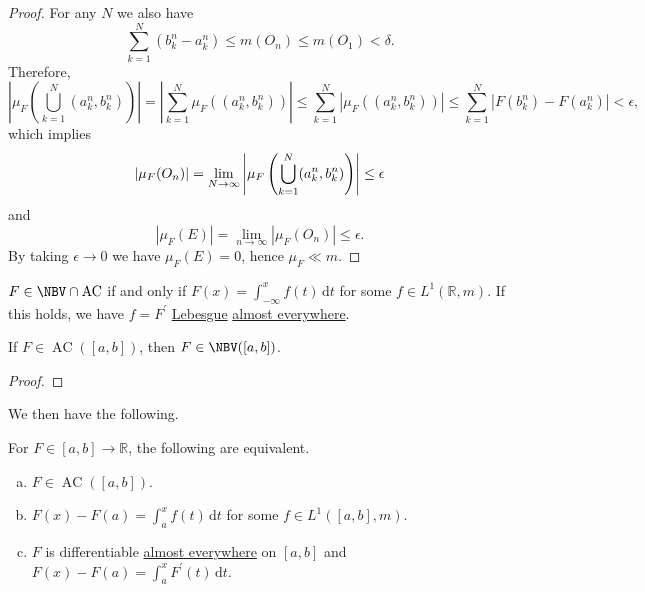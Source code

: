 \begin{proof}
	For any \(N\) we also have
	\[
		\sum_{k=1}^N (b_k^n - a_k^n) \leq m(O_n) \leq m(O_1) < \delta.
	\]
	Therefore,
	\[
		\left\vert \mu_F\left( \bigcup_{k=1}^N (a_k^n,b_k^n) \right) \right\vert
		= \left\vert \sum_{k=1}^N \mu_F((a_k^n,b_k^n)) \right\vert
		\leq \sum_{k=1}^N \left\vert \mu_F((a_k^n,b_k^n)) \right\vert
		\leq \sum_{k=1}^N \left\vert F(b_k^n) - F(a_k^n) \right\vert < \epsilon,
	\]
	which implies
	\[
		\left\vert \mu_F(O_n) \right\vert = \lim_{N \to \infty} \left\vert \mu_F\left( \bigcup_{k=1}^N (a_k^n,b_k^n) \right) \right\vert \leq \epsilon \\
	\]
	and
	\[
		\left\vert \mu_F(E) \right\vert = \lim_{n \to \infty} \left\vert \mu_F(O_n) \right\vert \leq \epsilon.
	\]
	By taking \(\epsilon \to 0\) we have \(\mu_F(E) = 0\), hence \(\mu_F \ll m\).
\end{proof}

\begin{corollary}
	\(F \in \NBV \cap \operatorname{AC}\) if and only if \(F(x) = \int_{-\infty}^x f(t) \,\mathrm{d}t\) for some \(f \in L^1(\mathbb{R},m)\). If this holds, we have \(f = F^\prime \) \hyperref[def:Lebesgue-measure]{Lebesgue} \hyperref[def:mu-almost-everywhere]{almost everywhere}.
\end{corollary}

\begin{lemma}
	If \(F \in \operatorname{AC}([a,b])\), then \(F \in \NBV([a,b])\).
\end{lemma}
\begin{proof}
\end{proof}

We then have the following.

\begin{theorem}\label{thm:FTC}
	For \(F \in [a,b] \to \mathbb{R}\), the following are equivalent.
	\begin{enumerate}[(a)]
		\item \(F \in \operatorname{AC}([a,b])\).
		\item \(F(x) - F(a) = \int_a^x f(t) \,\mathrm{d}t\) for some \(f \in L^1([a,b],m)\).
		\item \(F\) is differentiable \hyperref[def:mu-almost-everywhere]{almost everywhere} on \([a,b]\) and \(F(x) - F(a) = \int_a^x F^\prime (t) \,\mathrm{d}t\).
	\end{enumerate}
\end{theorem}

